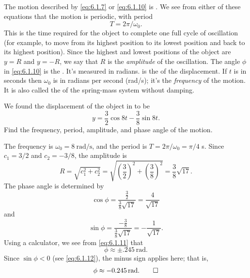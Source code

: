 The motion described by \eqref{eq:6.1.7} or \eqref{eq:6.1.10}
is  . We see from either of these
equations that the motion is periodic, with period
\[
T=2\pi/\omega_0.
\]
This is the time required for the object to complete one full cycle of
oscillation (for example, to move from its highest position to its
lowest position and back to its highest position). Since the highest
and lowest positions of the object are $y=R$ and $y=-R$, we say that
$R$ is the
\emph{\color{blue}amplitude}
of the oscillation. The angle $\phi$ in
\eqref{eq:6.1.10} is the . It's measured
in
radians.  is the  of the displacement. If $t$ is in seconds then $\omega_0$ is
in radians per second (rad/s);   it's  the
\emph{\color{blue}frequency}
of the motion. It is also called the
of the spring-mass system without damping.

\begin{example}\label{example:6.1.2}
We found the displacement of the object
 in  to be
\[
y=\frac{3}{2}\cos8t-\frac{3}{8}\sin8t.
\]
Find the frequency, period, amplitude, and phase angle of the motion.
\end{example}

\begin{solution}
The frequency is $\omega_0=\qty{8}{\radian\per\second}$, and the period is
$T=2\pi/\omega_0=\pi/4$ \unit{\second}. Since $c_1=3/2$ and $c_2=-3/8$,
the amplitude is
\[
R=\sqrt{c^2_1+c^2_2}=\sqrt{\left(\frac{3}{2}\right)^2+\left(\frac{3}{8}\right)^2}
=\frac{3}{8}\sqrt{17}.
\]
The phase angle is determined by
\begin{equation}\label{eq:6.1.11}
\cos\phi=\frac{\frac{3}{2}}{\frac{3}{8}\sqrt{17}}=\frac{4}{\sqrt{17}}
\end{equation}
and
\begin{equation}\label{eq:6.1.12}
\sin\phi=\frac{-\frac{3}{8}}{\frac{3}{8}\sqrt{17}}=-\frac{1}{\sqrt{17}}.
\end{equation}
 Using a calculator, we see from \eqref{eq:6.1.11} that
\[
\phi\approx\pm\qty{.245}{\radian}.
\]
Since $\sin\phi<0$ (see \eqref{eq:6.1.12}), the minus sign applies here;
that is,
\[
\phi\approx\qty{-.245}{\radian}.\qedhere
\]
\end{solution}



